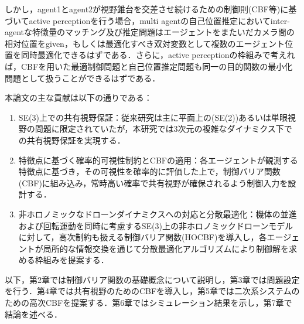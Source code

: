 しかし，agent1とagent2が視野錐台を交差させ続けるための制御則(CBF等)に基づいてactive perceptionを行う場合，multi agentの自己位置推定においてinter-agentな特徴量のマッチング及び推定問題はエージェントをまたいだカメラ間の相対位置をgiven，もしくは最適化すべき双対変数として複数のエージェント位置を同時最適化できるはずである．さらに，active perceptionの枠組みで考えれば，CBFを用いた最適制御問題と自己位置推定問題も同一の目的関数の最小化問題として扱うことができるはずである．

本論文の主な貢献は以下の通りである：

\begin{enumerate}
    \item SE(3)上での共有視野保証：従来研究は主に平面上の(SE(2))あるいは単眼視野の問題に限定されていたが，本研究では3次元の複雑なダイナミクス下での共有視野保証を実現する．
    \item 特徴点に基づく確率的可視性制約とCBFの適用：各エージェントが観測する特徴点に基づき，その可視性を確率的に評価した上で，制御バリア関数(CBF)に組み込み，常時高い確率で共有視野が確保されるよう制御入力を設計する．
    \item 非ホロノミックなドローンダイナミクスへの対応と分散最適化：機体の並進および回転運動を同時に考慮するSE(3)上の非ホロノミックドローンモデルに対して，高次制約も扱える制御バリア関数(HOCBF)を導入し，各エージェントが局所的な情報交換を通じて分散最適化アルゴリズムにより制御解を求める枠組みを提案する．
\end{enumerate}

以下，第2章では制御バリア関数の基礎概念について説明し，第3章では問題設定を行う．第4章では共有視野のためのCBFを導入し，第5章では二次系システムのための高次CBFを提案する．第6章ではシミュレーション結果を示し，第7章で結論を述べる．

